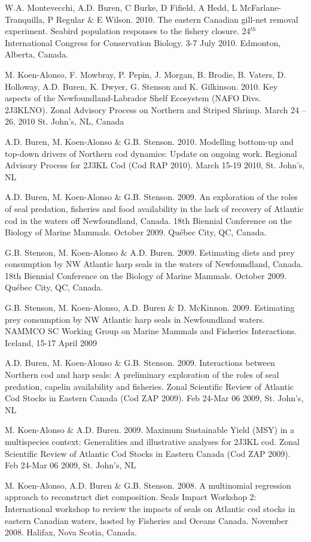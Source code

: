 \documentclass{res}
\begin{document}
\begin{resume}
\begin{hangparas}{.4in}{1}
W.A. Montevecchi, A.D. Buren, C Burke, D Fifield, A Hedd, L McFarlane-Tranquilla, P Regular \& E Wilson. 2010. The eastern Canadian gill-net removal experiment. Seabird population responses to the fishery closure. 24$^{th}$ International Congress for Conservation Biology. 3-7 July 2010. Edmonton, Alberta, Canada.

M. Koen-Alonso, F. Mowbray, P. Pepin, J. Morgan, B. Brodie, B. Vaters, D. Holloway, A.D. Buren, K. Dwyer, G. Stenson and K. Gilkinson. 2010. Key aspects of the Newfoundland-Labrador Shelf Ecosystem (NAFO Divs. 2J3KLNO). Zonal Advisory Process on Northern and Striped Shrimp. March 24 – 26, 2010 St. John’s, NL, Canada

A.D. Buren, M. Koen-Alonso \& G.B. Stenson. 2010. Modelling bottom-up and top-down drivers of Northern cod dynamics: Update on ongoing work. Regional Advisory Process for 2J3KL Cod (Cod RAP 2010). March 15-19 2010, St. John’s, NL

A.D. Buren, M. Koen-Alonso \& G.B. Stenson. 2009. An exploration of the roles of seal predation, fisheries and food availability in the lack of recovery of Atlantic cod in the waters off Newfoundland, Canada. 18th Biennial Conference on the Biology of Marine Mammals. October 2009. Qu\'{e}bec City, QC, Canada.

G.B. Stenson, M. Koen-Alonso \& A.D. Buren. 2009. Estimating diets and prey consumption by NW Atlantic harp seals in the waters of Newfoundland, Canada. 18th Biennial Conference on the Biology of Marine Mammals. October 2009. Qu\'{e}bec City, QC, Canada.

G.B. Stenson, M. Koen-Alonso, A.D. Buren \& D. McKinnon. 2009. Estimating prey consumption by NW Atlantic harp seals in Newfoundland waters. NAMMCO SC Working Group on Marine Mammals and Fisheries Interactions. Iceland, 15-17 April 2009

A.D. Buren, M. Koen-Alonso \& G.B. Stenson. 2009. Interactions between Northern cod and harp seals: A preliminary exploration of the roles of seal predation, capelin availability and fisheries. Zonal Scientific Review of Atlantic Cod Stocks in Eastern Canada (Cod ZAP 2009). Feb 24-Mar 06 2009, St. John’s, NL

M. Koen-Alonso \& A.D. Buren. 2009. Maximum Sustainable Yield (MSY) in a multispecies context: Generalities and illustrative analyses for 2J3KL cod. Zonal Scientific Review of Atlantic Cod Stocks in Eastern Canada (Cod ZAP 2009). Feb 24-Mar 06 2009, St. John’s, NL

M. Koen-Alonso, A.D. Buren \& G.B. Stenson. 2008. A multinomial regression approach to reconstruct diet composition. Seals Impact Workshop 2: International workshop to review the impacts of seals on Atlantic cod stocks in eastern Canadian waters, hosted by Fisheries and Oceans Canada. November 2008. Halifax, Nova Scotia, Canada.


\end{hangparas}
\end{resume}
\end{document}
